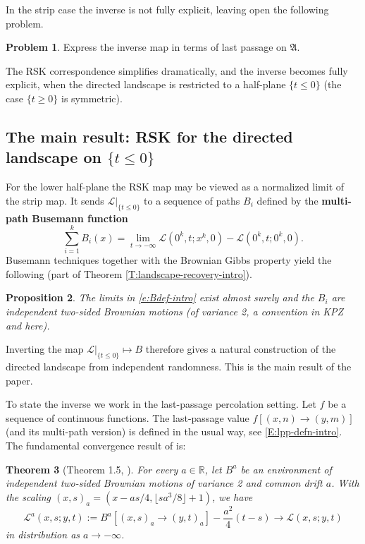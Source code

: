 \documentclass[11pt]{article}
\newtheorem{theorem}{Theorem}[section]
\newtheorem{proposition}[theorem]{Proposition}
\theoremstyle{definition} %
\newtheorem{problem}[theorem]{Problem}
\theoremstyle{remark} %
\begin{document}
In the strip case the inverse is not fully explicit, leaving open the following problem. 
\begin{problem}
Express the inverse map in terms of last passage on \(\mathfrak{A}\).
\end{problem}

The RSK correspondence simplifies dramatically, and the inverse becomes fully explicit, when the directed landscape is restricted to a half-plane \(\{t\le 0\}\) (the case \(\{t\ge 0\}\) is symmetric).

\subsection{The main result:  RSK for the directed landscape on \texorpdfstring{$\{t\le 0\}$}{tle0}}

For the lower half-plane the RSK map may be viewed as a normalized limit of the strip map. It sends \(\mathcal{L}|_{\{t\le 0\}}\) to a sequence of paths \(B_i\) defined by the {\bf multi-path Busemann function}
\begin{equation}
\label{e:Bdef-intro}
\sum_{i=1}^k B_i(x) = \lim_{t\to-\infty} \mathcal{L}(0^k,t;x^k,0) - \mathcal{L}(0^k,t;0^k,0).
\end{equation}
Busemann techniques together with the Brownian Gibbs property yield the following (part of Theorem \ref{T:landscape-recovery-intro}).

\begin{proposition}
The limits in \eqref{e:Bdef-intro} exist almost surely and the  \(B_i\) are independent two-sided Brownian motions (of variance 2, a convention in KPZ and here).
\end{proposition}

Inverting the map \(\mathcal{L}|_{\{t\le 0\}}\mapsto B\) therefore gives a natural construction of the directed landscape from independent randomness. This is the main result of the paper.

To state the inverse we work in the last-passage percolation setting. Let \(f\) be a sequence of continuous functions. The last-passage value \(f[(x,n)\to(y,m)]\) (and its multi-path version) is defined in the usual way, see \eqref{E:lpp-defn-intro}. The fundamental convergence result of \cite{DOV} is:

\begin{theorem}[Theorem 1.5, \cite{DOV}]
\label{T:DL-cvg-intro}
For every \(a\in\mathbb{R}\), let \(B^a\) be an environment of independent two-sided Brownian motions of variance 2 and common drift \(a\). With the scaling \((x,s)_a=(x-as/4,\lfloor sa^3/8\rfloor+1)\), we have
\[
\mathcal{L}^a(x,s;y,t):=B^a[(x,s)_a\to(y,t)_a]-\frac{a^2}{4}(t-s)\to\mathcal{L}(x,s;y,t)
\]
in distribution as \(a\to-\infty\).
\end{theorem}
\end{document}
